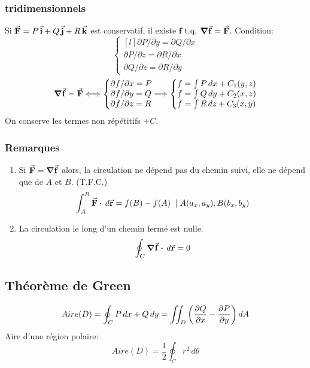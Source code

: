 \subsubsection{tridimensionnels}
Si \(\va{F}=P\,\va{i}+Q\,\va{j}+R\,\va{k}\) est conservatif, il existe $\mathbf{f}$ t.q. \(\grad{\va{f}}=\va{F}\).
Condition:
\begin{equation*}
        \left\{
    \begin{matrix*}[l]
        \partial P/\partial y = \partial Q/\partial x\\
        \partial P/\partial z = \partial R/\partial x\\
        \partial Q/\partial z = \partial R/\partial y
    \end{matrix*}
    \right.
\end{equation*}
\begin{equation*}
\grad{\va{f}}=\va{F}\Longleftrightarrow 
    \left\{
    \begin{matrix*}[l]
        \partial f/\partial x = P \\
        \partial f/\partial y = Q \\
        \partial f/\partial z = R
    \end{matrix*}
    \Longrightarrow
    \right.
    \left\{
    \begin{matrix*}[l]
        f= \int P\,dx +C_1(y,z) \\
        f= \int Q\,dy +C_2(x,z)\\
        f= \int R\,dz +C_3(x,y)
    \end{matrix*}
    \right.
\end{equation*}
On conserve les termes non répétitifs $+C$.

\subsubsection{Remarques}
\begin{enumerate}
    \item Si $\va{F}=\grad{\va{f}}$ alors, la circulation ne dépend pas du chemin suivi, elle ne dépend que de $A$ et $B$. (T.F.C.)
    \[ \int_A^B \va{F}\vdot\,d\va{r} = f(B) - f(A) \;\mid A(a_x,a_y),B(b_x,b_y)\]
    \item La circulation le long d'un chemin fermé est nulle.
    \[\oint_C \grad{\va{f}}\vdot\,d\va{r}=0\]
\end{enumerate}


\subsection{Théorème de Green}
\[ Aire(D) = \oint_C P\,dx + Q\,dy = \iint_D\qty(\frac{\partial Q}{\partial x}-\frac{\partial P}{\partial y}) \,dA \]
Aire d'une région polaire:
\[ Aire(D) = \frac{1}{2}\oint_C r^2 \,d\theta\]

